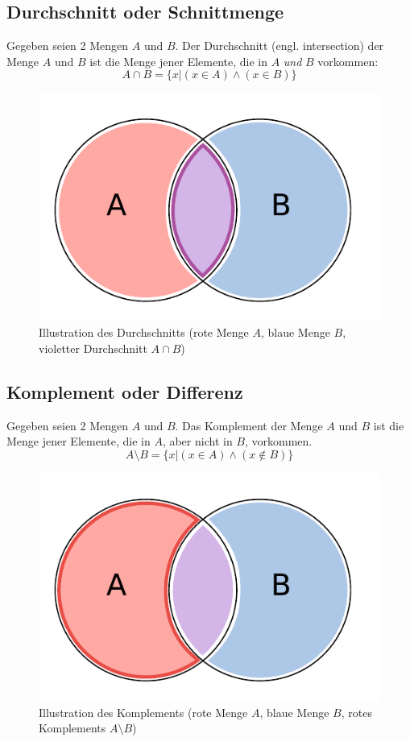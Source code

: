 \subsection{Durchschnitt oder Schnittmenge}
%
Gegeben seien 2 Mengen $A$ und $B$. Der Durchschnitt (engl. intersection)
der Menge $A$ und $B$ ist die Menge jener Elemente, die in $A$ \emph{und}
$B$ vorkommen:
\[
    A \cap B = \{x | (x \in A) \land (x \in B)\}
\]
%
\begin{figure}[p]
 \begin{center}
  \includegraphics{img/intersection.pdf}
  \caption{Illustration des Durchschnitts (rote Menge $A$, blaue Menge $B$,
        violetter Durchschnitt $A \cap B$)}
  \label{fig:union}
 \end{center}
\end{figure}

\subsection{Komplement oder Differenz}
%
Gegeben seien 2 Mengen $A$ und $B$. Das Komplement der Menge $A$ und $B$
ist die Menge jener Elemente, die in $A$, aber nicht in $B$, vorkommen.
\[
    A \setminus B = \{x | (x \in A) \land (x \notin B)\}
\]
%
\begin{figure}[p]
 \begin{center}
  \includegraphics{img/complement.pdf}
  \caption{Illustration des Komplements (rote Menge $A$, blaue Menge $B$,
        rotes Komplements $A \setminus B$)}
  \label{fig:complement}
 \end{center}
\end{figure}

